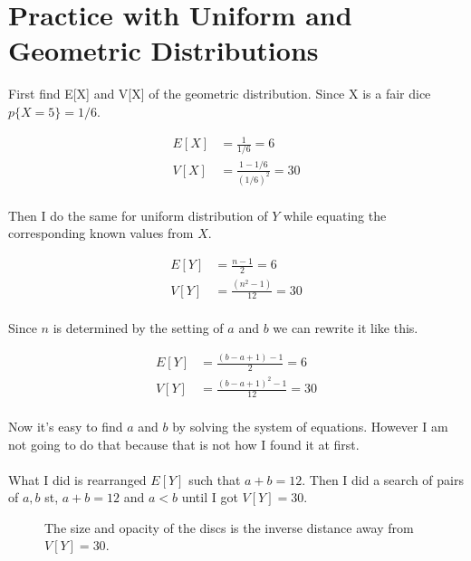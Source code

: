\documentclass[twocolumn]{article}
\begin{document}
\raggedbottom
\section{Practice with Uniform and Geometric Distributions}

First find E[X] and V[X] of the geometric distribution. Since X is a fair dice $p\{X=5\}= 1/6$.

\vspace{-10pt}
\begin{align*}
E[X] &= \frac{1}{1/6} = 6 \\
V[X] &= \frac{1-1/6}{(1/6)^2} = 30 \\
\end{align*}

\vspace{-20pt}
Then I do the same for uniform distribution of $Y$ while equating the corresponding known values from $X$.

\vspace{-25pt}
\begin{align*}
E[Y] &= \frac{n-1}{2} = 6 \\
V[Y] &= \frac{(n^2-1)}{12} = 30 \\
\end{align*}

\vspace{-18pt}
Since $n$ is determined by the setting of $a$ and $b$ we can rewrite it like this.

\vspace{-10pt}
\begin{align*}
E[Y] &= \frac{(b-a+1)-1}{2} = 6 \\
V[Y] &= \frac{(b-a+1)^2-1}{12} = 30 \\
\end{align*}

\vspace{-20pt}
Now it's easy to find $a$ and $b$ by solving the system of equations. However I am not going to do that because that is not how I found it at first. \\
\vspace{-10pt}
\\
What I did is rearranged $E[Y]$ such that $a+b=12$. Then I did a search of pairs of $a,b$ st, $a+b=12$ and $a<b$ until I got $V[Y]=30$.  


\vspace{-10pt}
\begin{figure}[H]
    \centering
    \vspace{-10pt}
    \caption{The size and opacity of the discs is the inverse distance away from $V[Y] = 30$.}
\end{figure}
\end{document}
